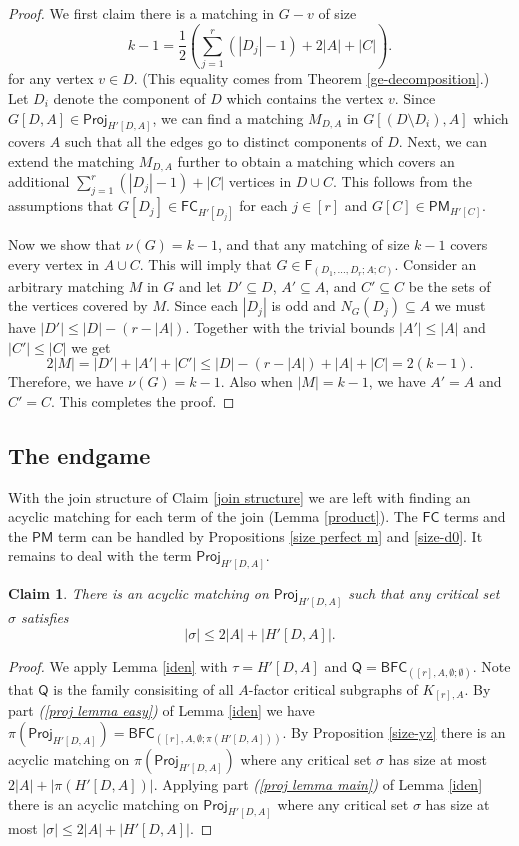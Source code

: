 \documentclass[10pt]{amsart}
\newtheorem{claim}[thm]{Claim}
\theoremstyle{definition}
\begin{document}
\begin{proof}
		We first claim there is a matching in $G-v$ of size 
		\[k-1=\textstyle{\frac{1}{2}}(\textstyle{\sum_{j=1}^r}(|D_j|-1) + 2|A| + |C|).\]
		for any vertex $v\in D$. (This equality comes from Theorem \ref{ge-decomposition}.) 
		Let $D_i$ denote the component of $D$ which contains the vertex $v$. Since $G[D,A]\in \mathsf{Proj}_{H'[D,A]}$, we can find a matching $M_{D,A}$ in $G[(D\setminus D_i), A]$ which covers $A$ such that all the edges go to distinct components of $D$. Next, we can extend the matching $M_{D,A}$ further to obtain a matching which covers an additional $\textstyle{\sum_{j=1}^r}(|D_j|-1)+|C|$ vertices in $D\cup C$. This follows from the assumptions that $G[D_j] \in \mathsf{FC}_{H'[D_j]}$ for each $j\in [r]$ and $G[C] \in \mathsf{PM}_{H'[C]}$. 
		
		Now we show that $\nu(G) = k-1$, and that any matching of size $k-1$ covers every vertex in $A\cup C$. This will imply that $G\in \mathsf{F}_{(D_1, \dots, D_r; A; C)}$. Consider an arbitrary matching $M$ in $G$ and let $D'\subseteq D$, $A'\subseteq A$, and $C'\subseteq C$ be the sets of the vertices covered by $M$. Since each $|D_j|$ is odd and $N_{G}(D_j)\subseteq A$ we must have $|D'|\leq |D| - (r-|A|)$. Together with the trivial bounds $|A'|\leq |A|$ and $|C'| \leq |C|$ we get 
		\[2|M| = |D'|+|A'|+|C'| \leq |D|-(r-|A|) + |A| + |C| = 2(k-1). \]
		Therefore, we have $\nu(G)=k-1$. Also when $|M|=k-1$, we have $A'=A$ and $C'=C$. This completes the proof.
	\end{proof}
	
	\subsection*{The endgame}
	With the join structure of Claim \ref{join structure} we are left with finding an acyclic matching for each term of the join (Lemma \ref{product}). The $\mathsf{FC}$ terms and the $\mathsf{PM}$ term can be handled by Propositions \ref{size perfect m} and \ref{size-d0}. It remains to  deal with the term $\mathsf{Proj}_{H'[D,A]}$.
	
	\begin{claim} \label{first-projection}
		There is an acyclic matching on $\mathsf{Proj}_{H'[D,A]}$ such that any critical set $\sigma$ satisfies 
		\[|\sigma| \leq 2|A| + |H'[D,A]|.\]
	\end{claim}
	
	\begin{proof}
		We apply Lemma \ref{iden} with $\tau = H'[D,A]$ and $\mathsf{Q} = \mathsf{BFC}_{([r], A, \emptyset; \emptyset)}$. Note that $\mathsf{Q}$ is the family consisiting of all $A$-factor critical subgraphs of $K_{[r],A}$. By part {\em (\ref{proj lemma easy})} of Lemma \ref{iden} we have
		$\pi(\mathsf{Proj}_{H'[D,A]})
		= \mathsf{BFC}_{([r],A,\emptyset; \pi(H'[D,A]))}$.
		By Proposition \ref{size-yz} there is an acyclic matching on $\pi(\mathsf{Proj}_{H'[D,A]})$ where any critical set $\sigma$ has size at most $2|A| + |\pi(H'[D,A])|$. Applying part {\em (\ref{proj lemma main})} of Lemma \ref{iden} there is an acyclic matching on $\mathsf{Proj}_{H'[D,A]}$ where any critical set $\sigma$ has size at most $|\sigma| \leq 2|A| + |H'[D,A]|$.
	\end{proof}
	
\end{document}
